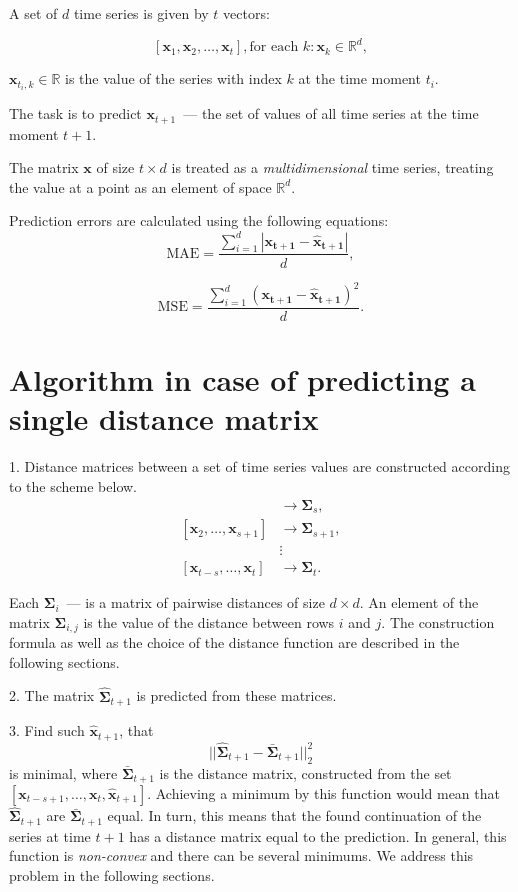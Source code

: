\documentclass{article}
\begin{document}
A set of $d$ time series is given by $t$ vectors:

$$[\mathbf{x}_1, \mathbf{x}_2, \ldots, \mathbf{x}_t], \text{for each } k: \mathbf{x}_k \in \mathbb{R}^d, $$

$\mathbf{x}_{t_i, k} \in \mathbb{R}$ is the value of the series with index $k$ at the time moment $t_i$.

The task is to predict $\mathbf{x}_{t+1}$~--- the set of values of all time series at the time moment $t+1$.

The matrix $\mathbf{x}$ of size $t \times d$ is treated as a \textit{multidimensional} time series, treating the value at a point as an element of space $\mathbb{R}^d$.

Prediction errors are calculated using the following equations:
\[
\text{MAE} = \frac{\sum_{i=1}^{d} |\mathbf{x_{t+1}} - \mathbf{\hat{x}_{t+1}}|}{d},
\]

\[
\text{MSE} = \frac{\sum_{i=1}^{d} (\mathbf{x_{t+1}} - \mathbf{\hat{x}_{t+1}})^2}{d}.
\]

\section{Algorithm in case of predicting a single distance matrix}

1. Distance matrices between a set of time series values are constructed according to the scheme below.
\begin{align*}
	[\mathbf{x}_1, \ldots, \mathbf{x}_s] &\rightarrow \mathbf{\Sigma}_s, \\
	[\mathbf{x}_2, \ldots, \mathbf{x}_{s+1}] &\rightarrow \mathbf{\Sigma}_{s+1}, \\
	&\vdots \\
	[\mathbf{x}_{t-s}, \ldots, \mathbf{x}_t] &\rightarrow \mathbf{\Sigma}_{t}.
\end{align*}

Each $\mathbf{\Sigma}_i$~--- is a matrix of pairwise distances of size $d \times d$. An element of the matrix $\mathbf{\Sigma}_{i,j}$ is the value of the distance between rows $i$ and $j$. The construction formula as well as the choice of the distance function are described in the following sections.

2. The matrix $\hat{\mathbf{\Sigma}}_{t+1}$ is predicted from these matrices.

3. Find such $\mathbf{\hat{x}}_{t+1}$, that \[ ||\hat{\mathbf{\Sigma}}_{t+1} - \bar{\mathbf{\Sigma}}_{t+1}||_2^2 \] is minimal, where $\bar{\mathbf{\Sigma}}_{t+1}$ is the distance matrix, constructed from the set $[\mathbf{x}_{t-s+1}, \ldots, \mathbf{x}_{t}, \mathbf{\hat{x}}_{t+1}]$. Achieving a minimum by this function would mean that $\hat{\mathbf{\Sigma}}_{t+1}$ are $\bar{\mathbf{\Sigma}}_{t+1}$ equal. In turn, this means that the found continuation of the series at time $t+1$ has a distance matrix equal to the prediction. In general, this function is \textit{non-convex} and there can be several minimums. We address this problem in the following sections.
\end{document}
